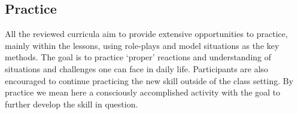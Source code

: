 \documentclass[prodmode,acmtochi]{acmsmall}
\newcommand{\todo}[1]{\textrm{\textrm{\textcolor{LightBlue}{[[#1]]}}}}
\begin{document}
        

        

        





\subsection{Practice}

All the reviewed curricula aim to provide extensive opportunities to practice, mainly within the lessons, using role-plays and model situations as the key methods. The goal is to practice `proper' reactions and understanding of situations and challenges one can face in daily life. Participants are also encouraged to continue practicing the new skill outside of the class setting. By practice we mean here a consciously accomplished activity with the goal to further develop the skill in question. 
        
\end{document}
